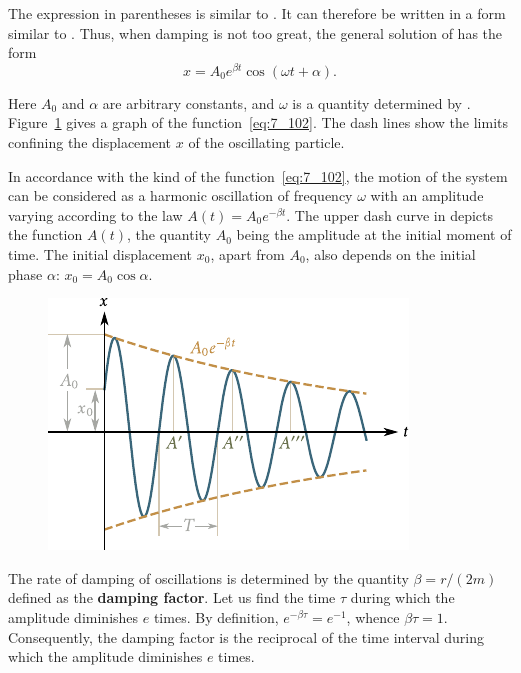 \noindent
The expression in parentheses is similar to . It can therefore be written in a form similar to . Thus, when damping is not too great, the general solution of  has the form
\begin{equation}\label{eq:7_102}
	x = A_0 e^{\beta t} \cos(\omega t + \alpha).
\end{equation}

\noindent
Here $A_0$ and $\alpha$ are arbitrary constants, and $\omega$ is a quantity determined by . Figure~\ref{fig:7_19} gives a graph of the function~\eqref{eq:7_102}. The dash lines show the limits confining the displacement $x$ of the oscillating particle.

In accordance with the kind of the function~\eqref{eq:7_102}, the motion of the system can be considered as a harmonic oscillation of frequency $\omega$ with an amplitude varying according to the law $A(t)=A_0e^{-\beta t}$. The upper dash curve in  depicts the function $A(t)$, the quantity $A_0$ being the amplitude at the initial moment of time. The initial displacement $x_0$, apart from $A_0$, also depends on the initial phase $\alpha$: $x_0=A_0\cos\alpha$.

\begin{figure}[t]
	\begin{center}
		\includegraphics[scale=1.0]{figures/ch_07/fig_7_19.pdf}
		\caption[]{}
		\label{fig:7_19}
	\end{center}
	\vspace{-0.8cm}
\end{figure}

The rate of damping of oscillations is determined by the quantity $\beta=r/(2m)$ defined as the \textbf{damping factor}. Let us find the time $\tau$ during which the amplitude diminishes $e$ times. By definition, $e^{-\beta\tau}=e^{-1}$, whence $\beta\tau=1$. Consequently, the damping factor is the reciprocal of the time interval during which the amplitude diminishes $e$ times.

